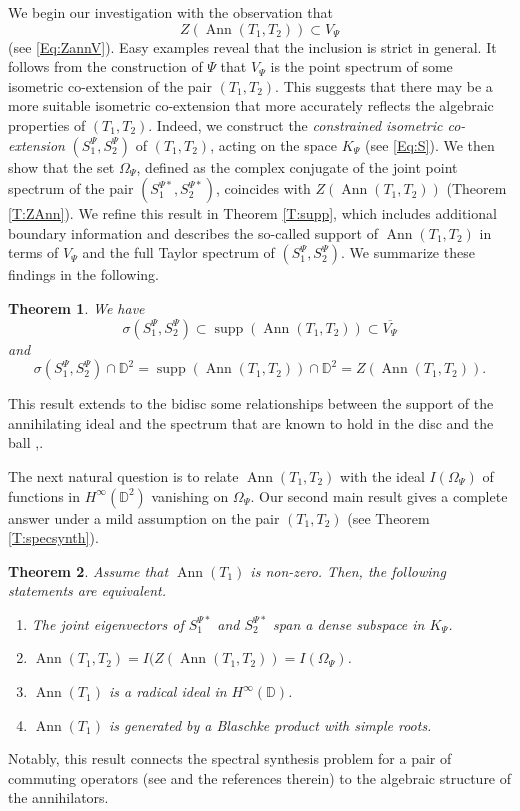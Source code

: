 \documentclass[10pt]{amsart}
\newcommand{\bD}{{\mathbb{D}}}
\newcommand{\ol}{\overline}
\newcommand{\supp}{\operatorname{supp}}
\newcommand{\Ann}{\operatorname{Ann}}
\newtheorem{theoremx}{Theorem}
\theoremstyle{definition}
\begin{document}
We begin our investigation with the observation that
	\[
	Z(\Ann(T_1,T_2)) \subset V_\Psi
	\]
	(see \eqref{Eq:ZannV}). Easy examples reveal that the inclusion is strict in general. It follows from the construction of $\Psi$  that $V_\Psi$ is  the point spectrum of some isometric co-extension of the pair $(T_1,T_2)$. This suggests that there may be a more suitable isometric co-extension that more accurately reflects the algebraic properties of $(T_1,T_2)$. Indeed, we construct the \emph{constrained isometric co-extension} $(S_1^\Psi, S_2^\Psi)$ of $(T_1,T_2)$, acting on the space $K_\Psi$ (see \eqref{Eq:S}). We then show that the set $\Omega_\Psi$, defined as the complex conjugate of the joint point spectrum of the pair $(S_1^{\Psi*}, S_2^{\Psi*})$, coincides with $Z(\Ann(T_1,T_2))$ (Theorem \ref{T:ZAnn}). We refine this result in Theorem \ref{T:supp}, which includes additional boundary information and describes the so-called support of $\Ann(T_1,T_2)$  \cite{CT2023} in terms of $V_\Psi$ and the full Taylor spectrum of $(S^\Psi_1,S^\Psi_2)$. We summarize these findings in the following.


\begin{theoremx}\label{T:C}
We have 
\[
\sigma(S^\Psi_1,S^\Psi_2)\subset \supp(\Ann(T_1,T_2))\subset \ol{V_\Psi}
\]
and
\[
\sigma(S^\Psi_1,S^\Psi_2)\cap \bD^2=\supp(\Ann(T_1,T_2))\cap \bD^2=Z(\Ann(T_1,T_2)).
\]
\end{theoremx}

This result extends to the bidisc some relationships between the support of the annihilating ideal and the spectrum that are known to hold in the disc and the ball \cite{bercovici1988},\cite{CT2023}.


The next natural question is to relate $\Ann(T_1,T_2)$ with the ideal $I(\Omega_\Psi)$ of functions in $H^\infty(\bD^2)$ vanishing on $\Omega_\Psi$. Our second main result gives a complete answer under a mild assumption on the pair $(T_1,T_2)$ (see Theorem \ref{T:specsynth}). 


\begin{theoremx}\label{T:B}
 Assume that $\Ann(T_1)$ is non-zero. Then, the following statements are equivalent.
\begin{enumerate}[{\rm (i)}]
\item The joint eigenvectors of $S_1^{\Psi *}$ and $S_2^{\Psi *}$ span a dense subspace in $K_\Psi$.
\item $\Ann(T_1,T_2)=I(Z(\Ann(T_1,T_2))=I(\Omega_\Psi)$.
\item $\Ann(T_1)$ is a radical ideal in $H^\infty(\bD)$.
\item $\Ann(T_1)$ is generated by a Blaschke product with simple roots.
\end{enumerate}
\end{theoremx}
Notably, this result connects the spectral synthesis problem for a pair of commuting operators (see  \cite{BaranovBelov} and the references therein) to  the algebraic structure of the annihilators.
\end{document}

